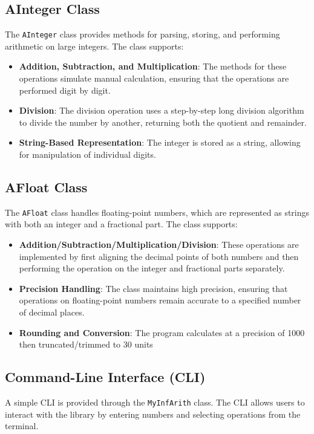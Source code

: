 \documentclass[12pt]{article}
\begin{document}
\subsection{AInteger Class}
The \texttt{AInteger} class provides methods for parsing, storing, and performing arithmetic on large integers. The class supports:
\begin{itemize}
    \item \textbf{Addition, Subtraction, and Multiplication}: The methods for these operations simulate manual calculation, ensuring that the operations are performed digit by digit.
    \item \textbf{Division}: The division operation uses a step-by-step long division algorithm to divide the number by another, returning both the quotient and remainder.
    \item \textbf{String-Based Representation}: The integer is stored as a string, allowing for manipulation of individual digits.
\end{itemize}

\subsection{AFloat Class}
The \texttt{AFloat} class handles floating-point numbers, which are represented as strings with both an integer and a fractional part. The class supports:
\begin{itemize}
    \item \textbf{Addition/Subtraction/Multiplication/Division}: These operations are implemented by first aligning the decimal points of both numbers and then performing the operation on the integer and fractional parts separately.
    \item \textbf{Precision Handling}: The class maintains high precision, ensuring that operations on floating-point numbers remain accurate to a specified number of decimal places.
    \item \textbf{Rounding and Conversion}: The program calculates at a precision of 1000 then truncated/trimmed to 30 units
\end{itemize}

\subsection{Command-Line Interface (CLI)}
A simple CLI is provided through the \texttt{MyInfArith} class. The CLI allows users to interact with the library by entering numbers and selecting operations from the terminal.
\end{document}
